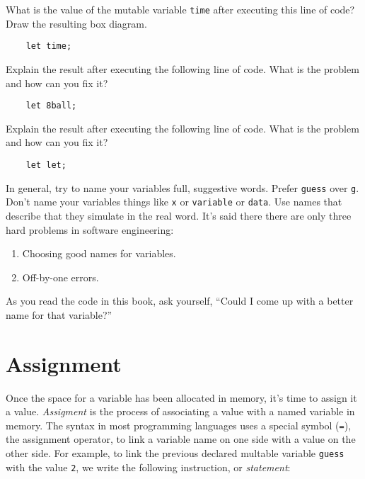 \begin{question}
  What is the value of the mutable variable \texttt{time} after executing this line of code? Draw the resulting box diagram.
  \begin{lstlisting}
    let time;
  \end{lstlisting}
\end{question}

\begin{question}
  Explain the result after executing the following line of code. What is the problem and how can you fix it?
  \begin{lstlisting}
    let 8ball;
  \end{lstlisting}
\end{question}

\begin{question}
  Explain the result after executing the following line of code. What is the problem and how can you fix it?
  \begin{lstlisting}
    let let;
  \end{lstlisting}
\end{question}

In general, try to name your variables full, suggestive words. Prefer \texttt{guess} over \texttt{g}. Don't name your variables things like \texttt{x} or \texttt{variable} or \texttt{data}. Use names that describe that they simulate in the real word. It's said there there are only three hard problems in software engineering:

\begin{enumerate}
  \item Choosing good names for variables.
  \item Off-by-one errors.
\end{enumerate}

As you read the code in this book, ask yourself, ``Could I come up with a better name for that variable?''

\section{Assignment}
Once the space for a variable has been allocated in memory, it's time to assign it a value. \emph{Assigment} is the process of associating a value with a named variable in memory. The syntax in most programming languages uses a special symbol (\texttt{=}), the assignment operator, to link a variable name on one side with a value on the other side.  For example, to link the previous declared multable variable \texttt{guess} with the value \texttt{2}, we write the following instruction, or \emph{statement}:


